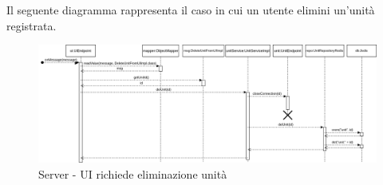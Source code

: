 		\begin{landscape}
			Il seguente diagramma rappresenta il caso in cui un utente elimini un'unità registrata.
			\begin{figure}[H]
				\centering
				\includegraphics[width=25.7cm]{img/server_seq3.png}
				\caption{Server - UI richiede eliminazione unità}
			\end{figure}
		\end{landscape}
	
